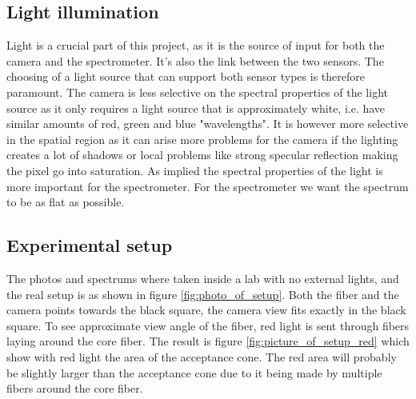 \subsection{Light illumination}
Light is a crucial part of this project, as it is the source of input for both the camera and the spectrometer. It's also the link between the two sensors. The choosing of a light source that can support both sensor types is therefore paramount. The camera is less selective on the spectral properties of the light source as it only requires a light source that is approximately white, i.e. have similar amounts of red, green and blue "wavelengths". It is however more selective in the spatial region as it can arise more problems for the camera if the lighting creates a lot of shadows or local problems like strong specular reflection making the pixel go into saturation. As implied the spectral properties of the light is more important for the spectrometer. For the spectrometer we want the spectrum to be as flat as possible. 


\subsection{Experimental setup}
The photos and spectrums where taken inside a lab with no external lights, and the real setup is as shown in figure \ref{fig:photo_of_setup}. Both the fiber and the camera points towards the black square, the camera view fits exactly in the black square. To see approximate view angle of the fiber, red light is sent through fibers laying around the core fiber. The result is figure \ref{fig:picture_of_setup_red} which show with red light the area of the acceptance cone. The red area will probably be slightly larger than the acceptance cone due to it being made by multiple fibers around the core fiber. 



